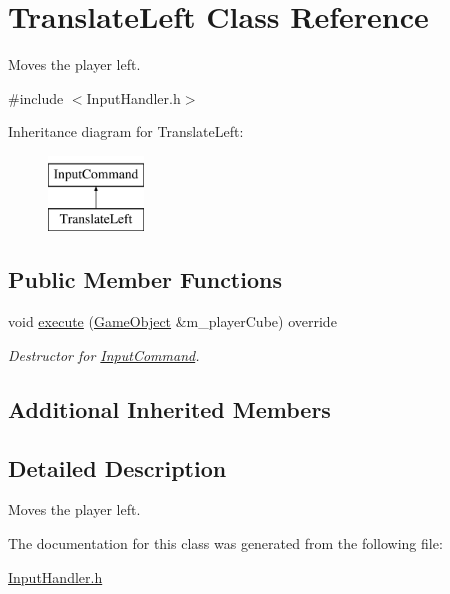 \hypertarget{class_translate_left}{}\section{Translate\+Left Class Reference}
\label{class_translate_left}


Moves the player left.  




{\ttfamily \#include $<$Input\+Handler.\+h$>$}

Inheritance diagram for Translate\+Left\+:\begin{figure}[H]
\begin{center}
\leavevmode
\includegraphics[height=2.000000cm]{class_translate_left}
\end{center}
\end{figure}
\subsection*{Public Member Functions}
\begin{DoxyCompactItemize}
\item 
\mbox{\label{class_translate_left_a2cd4c38f05d93e318d0ba38d42acb967}} 
void \mbox{\hyperlink{class_translate_left_a2cd4c38f05d93e318d0ba38d42acb967}{execute}} (\mbox{\hyperlink{class_game_object}{Game\+Object}} \&m\+\_\+player\+Cube) override
\begin{DoxyCompactList}\small\item\em Destructor for \mbox{\hyperlink{class_input_command}{Input\+Command}}. \end{DoxyCompactList}\end{DoxyCompactItemize}
\subsection*{Additional Inherited Members}


\subsection{Detailed Description}
Moves the player left. 

The documentation for this class was generated from the following file\+:\begin{DoxyCompactItemize}
\item 
\mbox{\hyperlink{_input_handler_8h}{Input\+Handler.\+h}}\end{DoxyCompactItemize}
